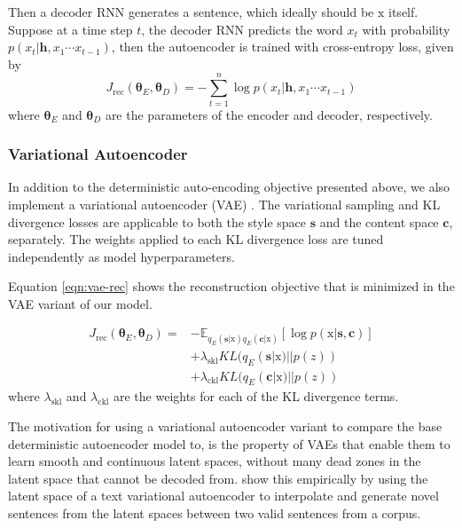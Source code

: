 \documentclass[11pt,a4paper]{article}
\newcommand{\rmx}{\mathrm x}
\newcommand{\loss}[1]{J_\text{#1}}
\begin{document}
Then a decoder RNN generates a sentence, which ideally should be $\rmx$ itself. Suppose at a time step $t$, the decoder RNN predicts the word $x_t$ with probability $p(x_t|\bm h, x_1\cdots x_{t-1})$, then the autoencoder is trained with cross-entropy loss, given by
\begin{equation}
	\loss{rec}(\bm\theta_E,\bm\theta_D)= -\sum_{t=1}^n \log p(x_t|\bm h, x_1\cdots x_{t-1})
\end{equation}
where $\bm\theta_E$ and $\bm\theta_D$ are the parameters of the encoder and decoder, respectively.

\subsubsection{Variational Autoencoder}

In addition to the deterministic auto-encoding objective presented above, we also implement a variational autoencoder (VAE) \cite{kingma2013auto}. The variational sampling and KL divergence losses are applicable to both the style space $\bm s$ and the content space $\bm c$, separately. The weights applied to each KL divergence loss are tuned independently as model hyperparameters.

Equation \ref{eqn:vae-rec} shows the reconstruction objective that is minimized in the VAE variant of our model.

\begin{align} \label{eqn:vae-rec}
	\loss{rec}(\bm\theta_E, \bm\theta_D) = \nonumber
	 & - \mathbb{E}_{q_{E}(\bm s|\rmx) q_{E}(\bm c|\rmx)} [\log p(\rmx|\bm s, \bm c)] \nonumber \\
	 & + \lambda_{\text{skl}} KL(q_{E}(\bm s|\rmx)||p(z)) \nonumber                             \\
	 & + \lambda_{\text{ckl}} KL(q_{E}(\bm c|\rmx)||p(z))
\end{align}
where $\lambda_{\text{skl}}$ and $\lambda_{\text{ckl}}$ are the weights for each of the KL divergence terms.

The motivation for using a variational autoencoder variant to compare the base deterministic autoencoder model to, is the property of VAEs that enable them to learn smooth and continuous latent spaces, without many dead zones in the latent space that cannot be decoded from. \cite{bowman2016generating} show this empirically by using the latent space of a text variational autoencoder to interpolate and generate novel sentences from the latent spaces between two valid sentences from a corpus.
\end{document}
